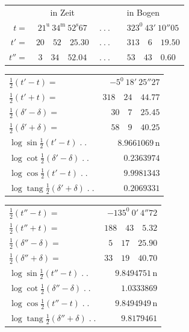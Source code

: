\begin{center}\small
\begin{tabular}{rcrcl}
&in Zeit&&&in Bogen\\
$t=$&$21^{\mathrm u}\ 34^{\mathrm m}\ 52^{\mathrm s}67$&$\ .\ .\ .$&&$323^0\ 43'\ 10''05$\\
$t'=$&$20\quad52\quad25.30$&$\ .\ .\ .$&&$313\quad6\quad19.50$\\
$t''=$&$3\quad34\quad52.04$&$\ .\ .\ .$&&$53\quad43\quad0.60$
\end{tabular}
\par\medskip
\begin{minipage}[t]{.49\textwidth}\centering
\begin{tabular}[t]{@{}lr@{}}
$\tfrac12(t'-t)=$&$-5^0\ 18'\ 25''27$\\
$\tfrac12(t'+t)=$&$318\quad24\quad44.77$\\[6pt]
$\tfrac12(\delta'-\delta)=$&$30\quad7\quad25.45$\\
$\tfrac12(\delta'+\delta)=$&$58\quad9\quad40.25$\\[6pt]
$\log\sin\tfrac12(t'-t)\;.\;.$&$8.9661069\,\mathrm n$\\
$\log\cot\tfrac12(\delta'-\delta)\;.\;.$&$0.2363974$\\[6pt]
$\log\cos\tfrac12(t'-t)\;.\;.$&$9.9981343$\\
$\log\operatorname{tang}\tfrac12(\delta'+\delta)\;.\;.$&$0.2069331$
\end{tabular}
\end{minipage}\hfill
\begin{minipage}[t]{.49\textwidth}\centering
\begin{tabular}[t]{@{}lr@{}}
$\tfrac12(t''-t)=$&$-135^0\ 0'\ 4''72$\\
$\tfrac12(t''+t)=$&$188\quad43\quad5.32$\\[6pt]
$\tfrac12(\delta''-\delta)=$&$5\quad17\quad25.90$\\
$\tfrac12(\delta''+\delta)=$&$33\quad19\quad40.70$\\[6pt]
$\log\sin\tfrac12(t''-t)\;.\;.$&$9.8494751\,\mathrm n$\\
$\log\cot\tfrac12(\delta''-\delta)\;.\;.$&$1.0333869$\\[6pt]
$\log\cos\tfrac12(t''-t)\;.\;.$&$9.8494949\,\mathrm n$\\
$\log\operatorname{tang}\tfrac12(\delta''+\delta)\;.\;.$&$9.8179461$
\end{tabular}
\end{minipage}
\end{center}
